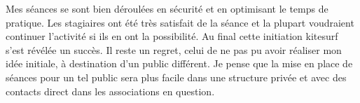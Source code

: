 \documentclass[12pt,a4paper]{report}
\begin{document}
Mes séances se sont bien déroulées en sécurité et en optimisant 
le temps de pratique. Les stagiaires ont été très satisfait de la 
séance et la plupart voudraient continuer l'activité si ils en 
ont la possibilité. 
Au final cette initiation kitesurf s'est révélée un succès.
Il reste un regret, celui de ne pas pu avoir réaliser mon idée initiale, 
à destination d'un public différent. Je pense que la mise en place de séances
pour un tel public sera plus facile dans une structure privée et avec des
contacts direct dans les associations en question.









\end{document}
